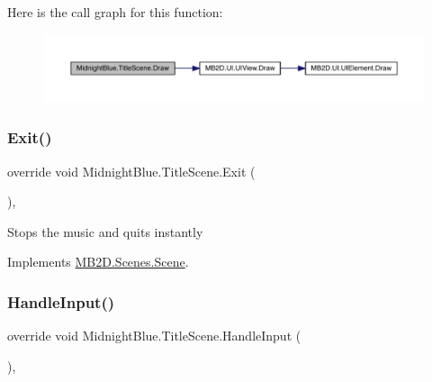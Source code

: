 Here is the call graph for this function\+:\nopagebreak
\begin{figure}[H]
\begin{center}
\leavevmode
\includegraphics[width=350pt]{class_midnight_blue_1_1_title_scene_a03fa806a36226ec5fd0ce09870109c18_cgraph}
\end{center}
\end{figure}
\hypertarget{class_midnight_blue_1_1_title_scene_aed29e37e9f849cc8f8443bae057a8eb8}{}\label{class_midnight_blue_1_1_title_scene_aed29e37e9f849cc8f8443bae057a8eb8} 
\subsubsection{\texorpdfstring{Exit()}{Exit()}}
{\footnotesize\ttfamily override void Midnight\+Blue.\+Title\+Scene.\+Exit (\begin{DoxyParamCaption}{ }\end{DoxyParamCaption})\hspace{0.3cm}{\ttfamily [inline]}, {\ttfamily [virtual]}}



Stops the music and quits instantly 



Implements \hyperlink{class_m_b2_d_1_1_scenes_1_1_scene_a099b79e16d23b67349847999d2336813}{M\+B2\+D.\+Scenes.\+Scene}.

\hypertarget{class_midnight_blue_1_1_title_scene_a54dc02f150eb90dac2fcc6e37a077723}{}\label{class_midnight_blue_1_1_title_scene_a54dc02f150eb90dac2fcc6e37a077723} 
\subsubsection{\texorpdfstring{Handle\+Input()}{HandleInput()}}
{\footnotesize\ttfamily override void Midnight\+Blue.\+Title\+Scene.\+Handle\+Input (\begin{DoxyParamCaption}{ }\end{DoxyParamCaption})\hspace{0.3cm}{\ttfamily [inline]}, {\ttfamily [virtual]}}



